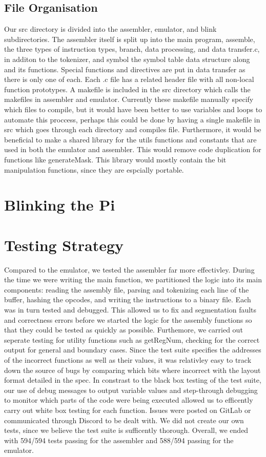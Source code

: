 \documentclass[11pt]{article}
\begin{document}
\subsection{File Organisation}
Our src directory is divided into the assembler, emulator, and blink subdirectories. The assembler itself is split up into the main program, assemble, the three types of instruction types, branch, data processing, and data transfer.c, in additon to the tokenizer, and symbol the symbol table data structure along and its functions. Special functions and directives are put in data transfer as there is only one of each. Each .c file has a related header file with all non-local function prototypes. A makefile is included in the src directory which calls the makefiles in assembler and emulator. Currently these makefile manually specify which files to compile, but it would have been better to use variables and loops to automate this proccess, perhaps this could be done by having a single makefile in src which goes through each directory and compiles file. Furthermore, it would be beneficial to make a shared library for the utils functions and constants that are used in both the emulator and assembler. This would remove code duplication for functions like generateMask. This library would mostly contain the bit manipulation functions, since they are espcially portable. 

\section{Blinking the Pi}


\section{Testing Strategy}
Compared to the emulator, we tested the assembler far more effectivley. During the time we were writing the main function, we partitioned the logic into its main components: reading the assembly file, parsing and tokenizing each line of the buffer, hashing the opcodes, and writing the instructions to a binary file. Each was in turn tested and debugged. This allowed us to fix and segmentation faults and correctness errors before we started the logic for the assembly functions so that they could be tested as quickly as possible. Furthemore, we carried out seperate testing for utility functions such as getRegNum, checking for the correct output for general and boundary cases. Since the test suite specifies the addresses of the incorrect functions as well as their values, it was relativley easy to track down the source of bugs by comparing which bits where incorrect with the layout format detailed in the spec. In constrast to the black box testing of the test suite, our use of debug messages to output variable values and step-through debugging to monitor which parts of the code were being executed allowed us to efficently carry out white box testing for each function. Issues were posted on GitLab or communicated through Discord to be dealt with. We did not create our own tests, since we believe the test suite is sufficently thorough. Overall, we ended with 594/594 tests passing for the assembler and 588/594 passing for the emulator. 
\end{document}
